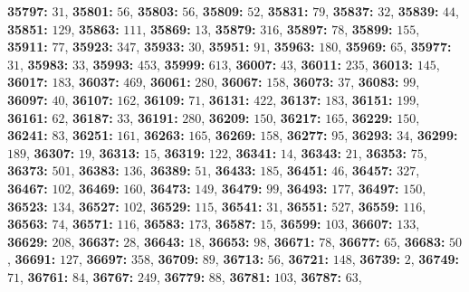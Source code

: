 \textsf{\bfseries 35797:} $31$, \textsf{\bfseries 35801:} $56$, \textsf{\bfseries 35803:} $56$, \textsf{\bfseries 35809:} $52$, \textsf{\bfseries 35831:} $79$, \textsf{\bfseries 35837:} $32$, \textsf{\bfseries 35839:} $44$, \textsf{\bfseries 35851:} $129$, \textsf{\bfseries 35863:} $111$, \textsf{\bfseries 35869:} $13$, \textsf{\bfseries 35879:} $316$, \textsf{\bfseries 35897:} $78$, \textsf{\bfseries 35899:} $155$, \textsf{\bfseries 35911:} $77$, \textsf{\bfseries 35923:} $347$, \textsf{\bfseries 35933:} $30$, \textsf{\bfseries 35951:} $91$, \textsf{\bfseries 35963:} $180$, \textsf{\bfseries 35969:} $65$, \textsf{\bfseries 35977:} $31$, \textsf{\bfseries 35983:} $33$, \textsf{\bfseries 35993:} $453$, \textsf{\bfseries 35999:} $613$, \textsf{\bfseries 36007:} $43$, \textsf{\bfseries 36011:} $235$, \textsf{\bfseries 36013:} $145$, \textsf{\bfseries 36017:} $183$, \textsf{\bfseries 36037:} $469$, \textsf{\bfseries 36061:} $280$, \textsf{\bfseries 36067:} $158$, \textsf{\bfseries 36073:} $37$, \textsf{\bfseries 36083:} $99$, \textsf{\bfseries 36097:} $40$, \textsf{\bfseries 36107:} $162$, \textsf{\bfseries 36109:} $71$, \textsf{\bfseries 36131:} $422$, \textsf{\bfseries 36137:} $183$, \textsf{\bfseries 36151:} $199$, \textsf{\bfseries 36161:} $62$, \textsf{\bfseries 36187:} $33$, \textsf{\bfseries 36191:} $280$, \textsf{\bfseries 36209:} $150$, \textsf{\bfseries 36217:} $165$, \textsf{\bfseries 36229:} $150$, \textsf{\bfseries 36241:} $83$, \textsf{\bfseries 36251:} $161$, \textsf{\bfseries 36263:} $165$, \textsf{\bfseries 36269:} $158$, \textsf{\bfseries 36277:} $95$, \textsf{\bfseries 36293:} $34$, \textsf{\bfseries 36299:} $189$, \textsf{\bfseries 36307:} $19$, \textsf{\bfseries 36313:} $15$, \textsf{\bfseries 36319:} $122$, \textsf{\bfseries 36341:} $14$, \textsf{\bfseries 36343:} $21$, \textsf{\bfseries 36353:} $75$, \textsf{\bfseries 36373:} $501$, \textsf{\bfseries 36383:} $136$, \textsf{\bfseries 36389:} $51$, \textsf{\bfseries 36433:} $185$, \textsf{\bfseries 36451:} $46$, \textsf{\bfseries 36457:} $327$, \textsf{\bfseries 36467:} $102$, \textsf{\bfseries 36469:} $160$, \textsf{\bfseries 36473:} $149$, \textsf{\bfseries 36479:} $99$, \textsf{\bfseries 36493:} $177$, \textsf{\bfseries 36497:} $150$, \textsf{\bfseries 36523:} $134$, \textsf{\bfseries 36527:} $102$, \textsf{\bfseries 36529:} $115$, \textsf{\bfseries 36541:} $31$, \textsf{\bfseries 36551:} $527$, \textsf{\bfseries 36559:} $116$, \textsf{\bfseries 36563:} $74$, \textsf{\bfseries 36571:} $116$, \textsf{\bfseries 36583:} $173$, \textsf{\bfseries 36587:} $15$, \textsf{\bfseries 36599:} $103$, \textsf{\bfseries 36607:} $133$, \textsf{\bfseries 36629:} $208$, \textsf{\bfseries 36637:} $28$, \textsf{\bfseries 36643:} $18$, \textsf{\bfseries 36653:} $98$, \textsf{\bfseries 36671:} $78$, \textsf{\bfseries 36677:} $65$, \textsf{\bfseries 36683:} $50$, \textsf{\bfseries 36691:} $127$, \textsf{\bfseries 36697:} $358$, \textsf{\bfseries 36709:} $89$, \textsf{\bfseries 36713:} $56$, \textsf{\bfseries 36721:} $148$, \textsf{\bfseries 36739:} $2$, \textsf{\bfseries 36749:} $71$, \textsf{\bfseries 36761:} $84$, \textsf{\bfseries 36767:} $249$, \textsf{\bfseries 36779:} $88$, \textsf{\bfseries 36781:} $103$, \textsf{\bfseries 36787:} $63$, 
